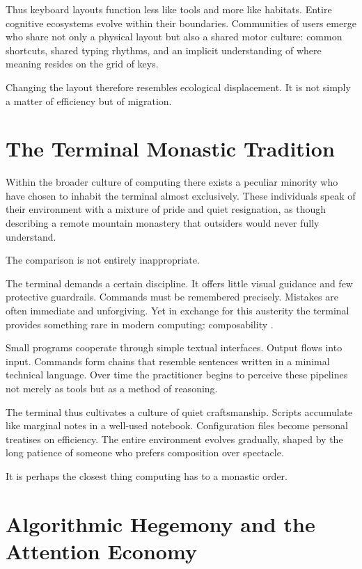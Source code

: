 \documentclass[12pt]{article}
\theoremstyle{definition}
\begin{document}
Thus keyboard layouts function less like tools and more like habitats.
Entire cognitive ecosystems evolve within their boundaries. Communities
of users emerge who share not only a physical layout but also a shared
motor culture: common shortcuts, shared typing rhythms, and an implicit
understanding of where meaning resides on the grid of keys.

Changing the layout therefore resembles ecological displacement. It is
not simply a matter of efficiency but of migration.

\section{The Terminal Monastic Tradition}

Within the broader culture of computing there exists a peculiar minority
who have chosen to inhabit the terminal almost exclusively. These
individuals speak of their environment with a mixture of pride and quiet
resignation, as though describing a remote mountain monastery that
outsiders would never fully understand.

The comparison is not entirely inappropriate.

The terminal demands a certain discipline. It offers little visual
guidance and few protective guardrails. Commands must be remembered
precisely. Mistakes are often immediate and unforgiving. Yet in
exchange for this austerity the terminal provides something rare in
modern computing: composability \cite{raymond2003,mcilroy1978}.

Small programs cooperate through simple textual interfaces. Output flows
into input. Commands form chains that resemble sentences written in a
minimal technical language. Over time the practitioner begins to perceive
these pipelines not merely as tools but as a method of reasoning.

The terminal thus cultivates a culture of quiet craftsmanship. Scripts
accumulate like marginal notes in a well-used notebook. Configuration
files become personal treatises on efficiency. The entire environment
evolves gradually, shaped by the long patience of someone who prefers
composition over spectacle.

It is perhaps the closest thing computing has to a monastic order.

\section{Algorithmic Hegemony and the Attention Economy}
\end{document}
